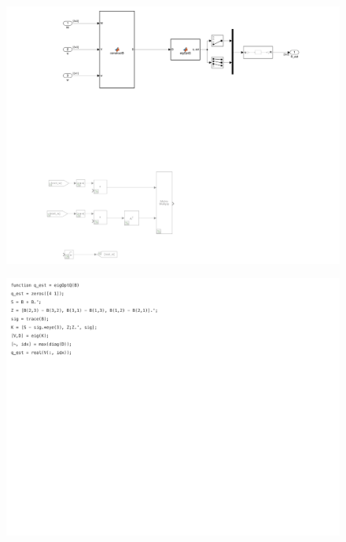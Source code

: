 \begin{figure}[H]
    \centering
    \captionsetup{ justification = centering }
    \includegraphics[trim={4cm 13cm 3cm 0cm},clip,width = 15cm]{Images/PS6/statisticalAttitude-1.png}
\end{figure}

\begin{figure}[H]
    \centering
    \captionsetup{ justification = centering }
    \includegraphics[trim={0cm 15cm 10cm 0cm},clip,width = 15cm]{Images/PS6/statisticalAttitude-2.png}
\end{figure}

